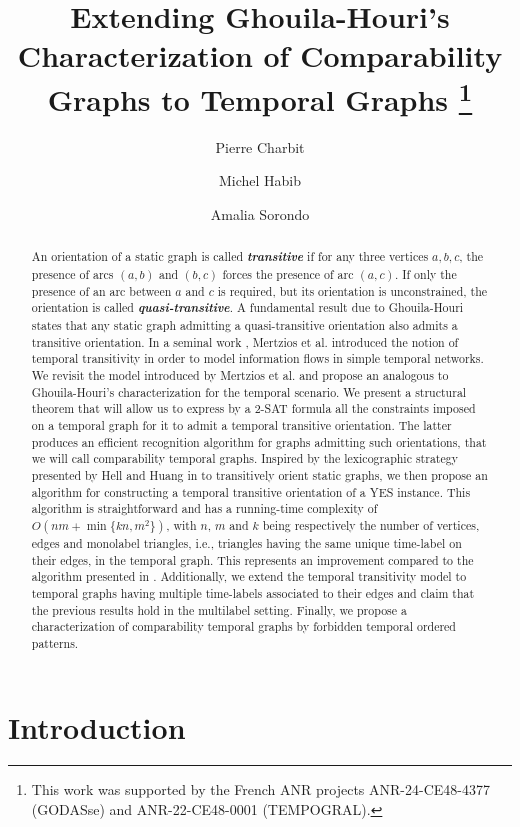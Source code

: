 \documentclass[runningheads]{llncs}
\title{Extending Ghouila-Houri's Characterization of Comparability Graphs to Temporal Graphs%
\thanks{This work was supported by the French ANR projects ANR-24-CE48-4377 (GODASse) and ANR-22-CE48-0001 (TEMPOGRAL).}}
\date{}
\author{Pierre Charbit \and
Michel Habib  \and
Amalia Sorondo}
\institute{}
\institute{Université Paris Cité, CNRS, IRIF, F-75013, Paris, France 
\\
\email{\{charbit,habib,sorondo\}@irif.fr}}
\newcommand{\bfit}[1]{\textbf{\textit{#1}}}
\begin{document}
\maketitle
\begin{abstract}
An orientation of a static graph is called \bfit{transitive} if for any three vertices $a,b,c$, the presence of arcs $(a,b)$ and $(b,c)$ forces the presence of arc $(a,c)$. If only the presence of an arc between $a$ and $c$ is required, but its orientation is unconstrained, the orientation is called \bfit{quasi-transitive}. A fundamental result due to Ghouila-Houri \cite{GhouilaHouri} states that any static graph admitting a quasi-transitive orientation also admits a transitive orientation. In a seminal work \cite{mertzios2025complexity}, Mertzios et al. introduced the notion of temporal transitivity in order to model information flows in simple temporal networks. We revisit the model introduced by Mertzios et al. and propose an analogous to Ghouila-Houri's characterization for the temporal scenario. We present a structural theorem that will allow us to express by a 2-SAT formula all the constraints imposed on a temporal graph for it to admit a temporal transitive orientation. The latter produces an efficient recognition algorithm for graphs admitting such orientations, that we will call comparability temporal graphs. Inspired by the lexicographic strategy presented by Hell and Huang in \cite{hell1995lexicographic} to transitively orient static graphs, we then propose an algorithm for constructing a temporal transitive orientation of a YES instance. This algorithm is straightforward and has a running-time complexity of $O(nm + \min\{kn,m^2\})$, with $n$, $m$ and $k$ being respectively the number of vertices, edges and monolabel triangles, i.e., triangles having the same unique time-label on their edges, in the temporal graph. This represents an improvement compared to the algorithm presented in \cite{mertzios2025complexity}. Additionally, we extend the temporal transitivity model to temporal graphs having multiple time-labels associated to their edges and claim that the previous results hold in the multilabel setting. Finally, we propose a characterization of comparability temporal graphs by forbidden temporal ordered patterns.
\end{abstract}

\section{Introduction}
\label{sect:intro}
\end{document}

